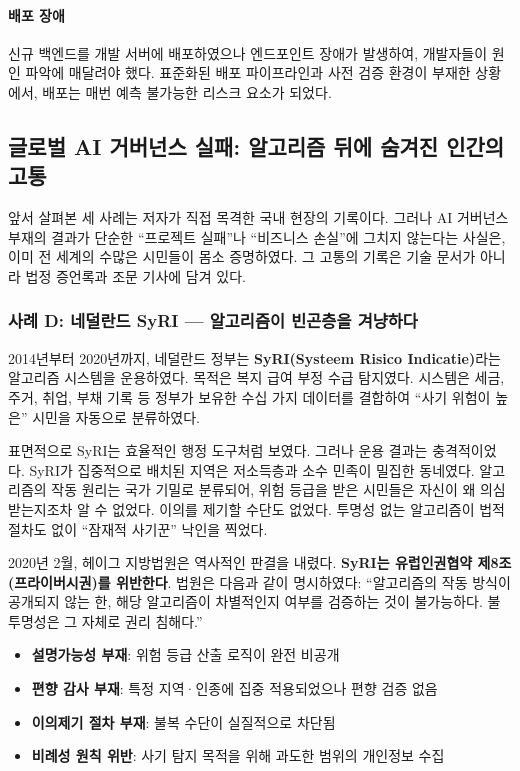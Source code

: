 \paragraph{배포 장애}
신규 백엔드를 개발 서버에 배포하였으나 엔드포인트 장애가 발생하여, 개발자들이 원인 파악에 매달려야 했다. 표준화된 배포 파이프라인과 사전 검증 환경이 부재한 상황에서, 배포는 매번 예측 불가능한 리스크 요소가 되었다.

\subsection{글로벌 AI 거버넌스 실패: 알고리즘 뒤에 숨겨진 인간의 고통}
\label{sec:1.3.4}

앞서 살펴본 세 사례는 저자가 직접 목격한 국내 현장의 기록이다. 그러나 AI 거버넌스 부재의 결과가 단순한 ``프로젝트 실패''나 ``비즈니스 손실''에 그치지 않는다는 사실은, 이미 전 세계의 수많은 시민들이 몸소 증명하였다. 그 고통의 기록은 기술 문서가 아니라 법정 증언록과 조문 기사에 담겨 있다.

\subsubsection*{사례 D: 네덜란드 SyRI --- 알고리즘이 빈곤층을 겨냥하다}

2014년부터 2020년까지, 네덜란드 정부는 \textbf{SyRI(Systeem Risico Indicatie)}라는 알고리즘 시스템을 운용하였다. 목적은 복지 급여 부정 수급 탐지였다. 시스템은 세금, 주거, 취업, 부채 기록 등 정부가 보유한 수십 가지 데이터를 결합하여 ``사기 위험이 높은'' 시민을 자동으로 분류하였다.

표면적으로 SyRI는 효율적인 행정 도구처럼 보였다. 그러나 운용 결과는 충격적이었다. SyRI가 집중적으로 배치된 지역은 저소득층과 소수 민족이 밀집한 동네였다. 알고리즘의 작동 원리는 국가 기밀로 분류되어, 위험 등급을 받은 시민들은 자신이 왜 의심받는지조차 알 수 없었다. 이의를 제기할 수단도 없었다. 투명성 없는 알고리즘이 법적 절차도 없이 ``잠재적 사기꾼'' 낙인을 찍었다.

2020년 2월, 헤이그 지방법원은 역사적인 판결을 내렸다. \textbf{SyRI는 유럽인권협약 제8조(프라이버시권)를 위반한다}. 법원은 다음과 같이 명시하였다: ``알고리즘의 작동 방식이 공개되지 않는 한, 해당 알고리즘이 차별적인지 여부를 검증하는 것이 불가능하다. 불투명성은 그 자체로 권리 침해다.''\cite{zuiderwijk2021implications}

\begin{tcolorbox}[colback=red!5!white, colframe=red!60!black, title={\textbf{거버넌스 진단: SyRI 실패의 핵심 원인}}]
\begin{itemize}
    \item \textbf{설명가능성 부재}: 위험 등급 산출 로직이 완전 비공개
    \item \textbf{편향 감사 부재}: 특정 지역·인종에 집중 적용되었으나 편향 검증 없음
    \item \textbf{이의제기 절차 부재}: 불복 수단이 실질적으로 차단됨
    \item \textbf{비례성 원칙 위반}: 사기 탐지 목적을 위해 과도한 범위의 개인정보 수집
\end{itemize}
\end{tcolorbox}

